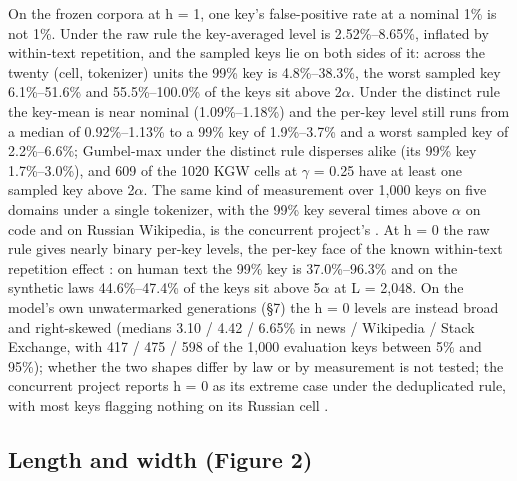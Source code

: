 \documentclass[11pt,letterpaper]{article}
\begin{document}
On the frozen corpora at h = 1, one key's false-positive rate at a nominal 1\% is not 1\%. Under the raw rule the key-averaged level is 2.52\%--8.65\%, inflated by within-text repetition, and the sampled keys lie on both sides of it: across the twenty (cell, tokenizer) units the 99\% key is 4.8\%--38.3\%, the worst sampled key 6.1\%--51.6\% and 55.5\%--100.0\% of the keys sit above 2\ensuremath{\alpha}. Under the distinct rule the key-mean is near nominal (1.09\%--1.18\%) and the per-key level still runs from a median of 0.92\%--1.13\% to a 99\% key of 1.9\%--3.7\% and a worst sampled key of 2.2\%--6.6\%; Gumbel-max under the distinct rule disperses alike (its 99\% key 1.7\%--3.0\%), and 609 of the 1020 KGW cells at \ensuremath{\gamma} = 0.25 have at least one sampled key above 2\ensuremath{\alpha}. The same kind of measurement over 1,000 keys on five domains under a single tokenizer, with the 99\% key several times above \ensuremath{\alpha} on code and on Russian Wikipedia, is the concurrent project's \citep{yukhimchuk2026keylottery}. At h = 0 the raw rule gives nearly binary per-key levels, the per-key face of the known within-text repetition effect \citep{fernandez2023bricks, kirchenbauer2024reliability}: on human text the 99\% key is 37.0\%--96.3\% and on the synthetic laws 44.6\%--47.4\% of the keys sit above 5\ensuremath{\alpha} at L = 2,048. On the model's own unwatermarked generations (\S{}7) the h = 0 levels are instead broad and right-skewed (medians 3.10 / 4.42 / 6.65\% in news / Wikipedia / Stack Exchange, with 417 / 475 / 598 of the 1,000 evaluation keys between 5\% and 95\%); whether the two shapes differ by law or by measurement is not tested; the concurrent project reports h = 0 as its extreme case under the deduplicated rule, with most keys flagging nothing on its Russian cell \citep{yukhimchuk2026keylottery}.

\hypertarget{length-and-width-figure-2}{%
\subsection{Length and width (Figure 2)}\label{length-and-width-figure-2}}
\end{document}
